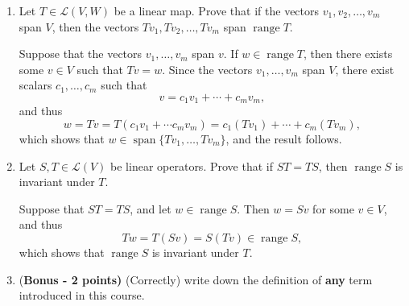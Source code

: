 \documentclass[12pt]{article}
\newcommand{\points}[1]{\marginpar{\hspace{24pt}[#1]}}
\DeclareMathOperator{\range}{range}
\begin{document}
\thispagestyle{fancy}


\bigskip

\begin{enumerate}
 \item Let $T\in\mathcal{L}(V,W)$ be a linear map. Prove that if the vectors $v_1,v_2,\ldots, v_m$ span $V$, then the vectors $Tv_1,Tv_2,\ldots, Tv_m$ span $\range T$.\points{5}


\bigskip

Suppose that the vectors $v_1,\ldots, v_m$ span $v$. If $w\in \range T$, then there exists some $v\in V$ such that $Tv=w$. Since the vectors $v_1,\ldots, v_m$ span $V$, there exist scalars $c_1,\ldots, c_m$ such that
\[
 v=c_1v_1+\cdots +c_mv_m,
\]
and thus
\[
 w=Tv = T(c_1v_1+\cdots c_mv_m) = c_1(Tv_1)+\cdots +c_m(Tv_m),
\]
which shows that $w\in\operatorname{span}\{Tv_1,\ldots, Tv_m\}$, and the result follows.

\bigskip


 \item Let $S,T\in \mathcal{L}(V)$ be linear operators. Prove that if $ST=TS$, then $\range S$ is invariant under $T$. \points{5}

\bigskip

Suppose that $ST=TS$, and let $w\in\range S$. Then $w=Sv$ for some $v\in V$, and thus
\[
 Tw=T(Sv)=S(Tv)\in\range S,
\]
which shows that $\range S$ is invariant under $T$.

\bigskip

 \item {(\bf Bonus - 2 points)} (Correctly) write down the definition of {\bf any} term introduced in this course.

\bigskip


\end{enumerate}
\end{document}
